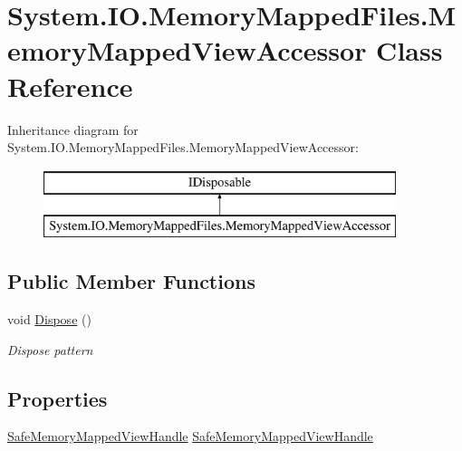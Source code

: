 \hypertarget{class_system_1_1_i_o_1_1_memory_mapped_files_1_1_memory_mapped_view_accessor}{}\section{System.\+I\+O.\+Memory\+Mapped\+Files.\+Memory\+Mapped\+View\+Accessor Class Reference}
\label{class_system_1_1_i_o_1_1_memory_mapped_files_1_1_memory_mapped_view_accessor}


 


Inheritance diagram for System.\+I\+O.\+Memory\+Mapped\+Files.\+Memory\+Mapped\+View\+Accessor\+:\begin{figure}[H]
\begin{center}
\leavevmode
\includegraphics[height=2.000000cm]{class_system_1_1_i_o_1_1_memory_mapped_files_1_1_memory_mapped_view_accessor}
\end{center}
\end{figure}
\subsection*{Public Member Functions}
\begin{DoxyCompactItemize}
\item 
void \hyperlink{class_system_1_1_i_o_1_1_memory_mapped_files_1_1_memory_mapped_view_accessor_a06a90c984306f96be5ef2dedce514319}{Dispose} ()
\begin{DoxyCompactList}\small\item\em Dispose pattern \end{DoxyCompactList}\end{DoxyCompactItemize}
\subsection*{Properties}
\begin{DoxyCompactItemize}
\item 
\hyperlink{class_microsoft_1_1_win32_1_1_safe_handles_1_1_safe_memory_mapped_view_handle}{Safe\+Memory\+Mapped\+View\+Handle} \hyperlink{class_system_1_1_i_o_1_1_memory_mapped_files_1_1_memory_mapped_view_accessor_a73b5caed9f0b740d407a350ec2633d9e}{Safe\+Memory\+Mapped\+View\+Handle}
\end{DoxyCompactItemize}


